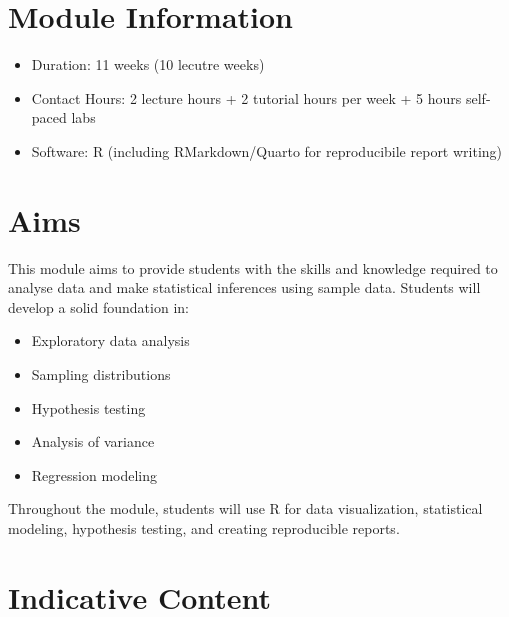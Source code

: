 \documentclass[
  a4paper,
  DIV=11,
  numbers=noendperiod,
  oneside]{scrreprt}
\providecommand{\tightlist}{%
  \setlength{\itemsep}{0pt}\setlength{\parskip}{0pt}}
\theoremstyle{plain}
\theoremstyle{definition}
\theoremstyle{definition}
\theoremstyle{definition}
\theoremstyle{plain}
\theoremstyle{remark}
\begin{document}
\section*{Module Information}\label{module-information}


\begin{itemize}
\tightlist
\item
  Duration: 11 weeks (10 lecutre weeks)
\item
  Contact Hours: 2 lecture hours + 2 tutorial hours per week + 5 hours
  self-paced labs
\item
  Software: R (including RMarkdown/Quarto for reproducibile report
  writing)
\end{itemize}

\section*{Aims}\label{aims}


This module aims to provide students with the skills and knowledge
required to analyse data and make statistical inferences using sample
data. Students will develop a solid foundation in:

\begin{itemize}
\tightlist
\item
  Exploratory data analysis\\
\item
  Sampling distributions\\
\item
  Hypothesis testing\\
\item
  Analysis of variance\\
\item
  Regression modeling
\end{itemize}

Throughout the module, students will use R for data visualization,
statistical modeling, hypothesis testing, and creating reproducible
reports.

\section*{Indicative Content}\label{indicative-content}
\end{document}
